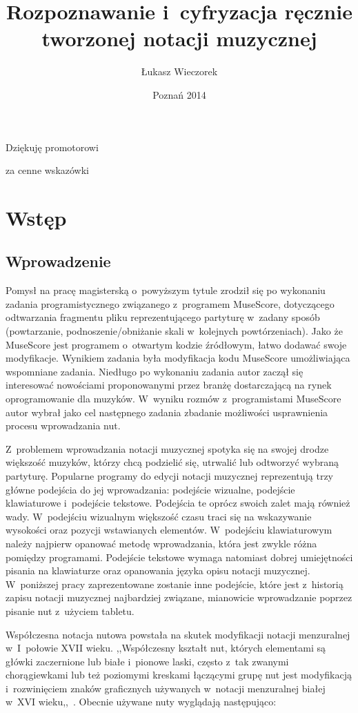 \documentclass[polish,thesis,12pt]{dcsbook}
\author{Łukasz Wieczorek}
\title{Rozpoznawanie i~cyfryzacja ręcznie tworzonej notacji muzycznej}
\date{Poznań 2014}
\newcommand{\blankpage}{
	\newpage
	\thispagestyle{empty}
	\mbox{}
	\newpage
}
\begin{document}
\frontmatter
\maketitle
{}
\null
\vfill
\hfill Dziękuję promotorowi

\hfill za cenne wskazówki
\newpage
\blankpage
{}
\tableofcontents

\mainmatter
\chapter{Wstęp}
\section{Wprowadzenie}
Pomysł na pracę magisterską o~powyższym tytule zrodził się po wykonaniu zadania programistycznego związanego z~programem MuseScore, dotyczącego odtwarzania fragmentu pliku reprezentującego partyturę w~zadany sposób (powtarzanie, podnoszenie/obniżanie skali w~kolejnych powtórzeniach). Jako że MuseScore jest programem o~otwartym kodzie źródłowym, łatwo dodawać swoje modyfikacje. Wynikiem zadania była modyfikacja kodu MuseScore umożliwiająca wspomniane zadania. Niedługo po wykonaniu zadania autor zaczął się interesować nowościami proponowanymi przez branżę dostarczającą na rynek oprogramowanie dla muzyków. W~wyniku rozmów z~programistami MuseScore autor wybrał jako cel następnego zadania zbadanie możliwości usprawnienia procesu wprowadzania nut.

Z~problemem wprowadzania notacji muzycznej spotyka się na swojej drodze większość muzyków, którzy chcą podzielić się, utrwalić lub odtworzyć wybraną partyturę. Popularne programy do edycji notacji muzycznej reprezentują trzy główne podejścia do jej wprowadzania: podejście wizualne, podejście klawiaturowe i~podejście tekstowe. Podejścia te oprócz swoich zalet mają również wady. W~podejściu wizualnym większość czasu traci się na wskazywanie wysokości oraz pozycji wstawianych elementów. W~podejściu klawiaturowym należy najpierw opanować metodę wprowadzania, która jest zwykle różna pomiędzy programami. Podejście tekstowe wymaga natomiast dobrej umiejętności pisania na klawiaturze oraz opanowania języka opisu notacji muzycznej. W~poniższej pracy zaprezentowane zostanie inne podejście, które jest z~historią zapisu notacji muzycznej najbardziej związane, mianowicie wprowadzanie poprzez pisanie nut z~użyciem tabletu.

Współczesna notacja nutowa powstała na skutek modyfikacji notacji menzuralnej w~I~połowie XVII wieku. ,,Współczesny kształt nut, których elementami są główki zaczernione lub białe i~pionowe laski, często z~tak zwanymi chorągiewkami lub też poziomymi kreskami łączącymi grupę nut jest modyfikacją i~rozwinięciem znaków graficznych używanych w~notacji menzuralnej białej w~XVI wieku,,~\cite{Encyklopedia}. Obecnie używane nuty wyglądają następująco:
\end{document}
